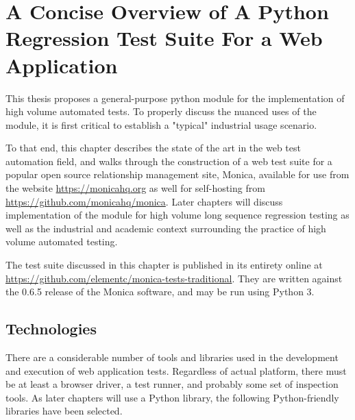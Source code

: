 \chapter{A Concise Overview of A Python Regression Test Suite For a Web Application}
This thesis proposes a general-purpose python module for the implementation of high volume automated tests. To properly discuss the nuanced uses of the module, it is first critical to establish a "typical" industrial usage scenario.

To that end, this chapter describes the state of the art in the web test automation field, and walks through the construction of a web test suite for a popular open source relationship management site, Monica, available for use from the website \url{https://monicahq.org} as well for self-hosting from \url{https://github.com/monicahq/monica}. Later chapters will discuss implementation of the module for high volume long sequence regression testing as well as the industrial and academic context surrounding the practice of high volume automated testing.

The test suite discussed in this chapter is published in its entirety online at \url{https://github.com/elementc/monica-tests-traditional}. They are written against the 0.6.5 release of the Monica software, and may be run using Python 3.

\section{Technologies}
There are a considerable number of tools and libraries used in the development and execution of web application tests. Regardless of actual platform, there must be at least a browser driver, a test runner, and probably some set of inspection tools. As later chapters will use a Python library, the following Python-friendly libraries have been selected.

